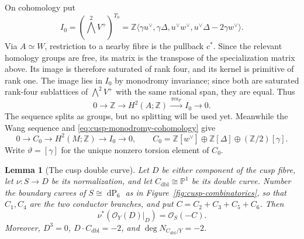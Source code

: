 \documentclass[11pt]{article}
\newtheorem{lemma}[theorem]{Lemma}
\theoremstyle{definition}
\theoremstyle{remark}
\numberwithin{equation}{section}
\newcommand{\dP}{\operatorname{dP}_6}
\begin{document}
On cohomology put
\begin{equation*}
 I_0=(\textstyle\bigwedge^2V^+)^{T_0}
 =\mathbb Z\langle
 \gamma u^\vee,\gamma\Delta,u^\vee w^\vee,
 u^\vee\Delta-2\gamma w^\vee\rangle.
\end{equation*}
Via $A\simeq W$, restriction to a nearby fibre is the pullback $c^*$.
Since the relevant homology groups are free, its matrix is the transpose of
the specialization matrix above.  Its image is therefore saturated of rank
four, and its kernel is primitive of rank one.  The image lies in $I_0$ by
monodromy invariance; since both are saturated rank-four sublattices of
$\bigwedge^2V^+$ with the same rational span, they are equal.  Thus
\begin{equation}\label{eq:cusp-H2-splitting}
 0\longrightarrow\mathbb Z
 \longrightarrow H^2(A;\mathbb Z)
 \xrightarrow{\ \operatorname{res}_F\ } I_0\longrightarrow0.
\end{equation}
The sequence splits as groups, but no splitting will be used yet.  Meanwhile
the Wang sequence and \eqref{eq:cusp-monodromy-cohomology} give
\begin{equation}\label{eq:cusp-Wang}
 0\longrightarrow C_0\longrightarrow H^2(M;\mathbb Z)
 \longrightarrow I_0\longrightarrow0,
 \qquad
 C_0=\mathbb Z[w^\vee]\oplus\mathbb Z[\Delta]
       \oplus(\mathbb Z/2)[\gamma].
\end{equation}
Write $\vartheta=[\gamma]$ for the unique nonzero torsion element of $C_0$.

\begin{lemma}[The cusp double curve]
\label{lem:cusp-double-curve}
Let $D$ be either component of the cusp fibre, let
$\nu:S\to D$ be its normalization, and let
$C_{\mathrm{dbl}}\cong\mathbb P^1$ be its double curve.  Number the boundary
curves of $S\cong\dP$ as in Figure~\ref{fig:cusp-combinatorics}, so that
$C_1,C_4$ are the two conductor branches, and put
$C=C_2+C_3+C_5+C_6$.  Then
\begin{equation}\label{eq:normalization-normal-bundle}
 \nu^*(\mathcal O_Y(D)|_D)=\mathcal O_S(-C).
\end{equation}
Moreover, $D^3=0$, $D\cdot C_{\mathrm{dbl}}=-2$, and
$\deg N_{C_{\mathrm{dbl}}/Y}=-2$.
\end{lemma}
\end{document}

